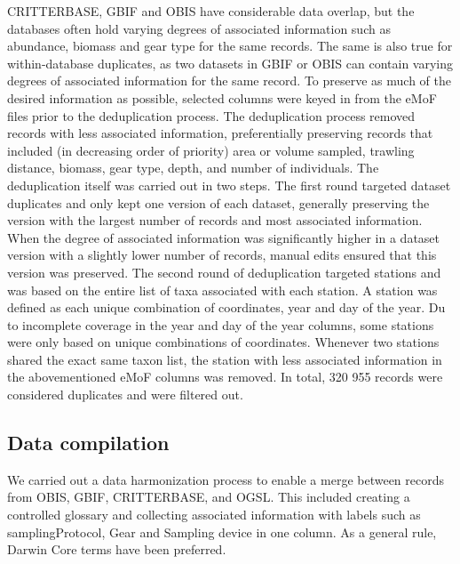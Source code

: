 \documentclass[
  letterpaper,
  DIV=11,
  numbers=noendperiod]{scrartcl}
\begin{document}
CRITTERBASE, GBIF and OBIS have considerable data overlap, but the
databases often hold varying degrees of associated information such as
abundance, biomass and gear type for the same records. The same is also
true for within-database duplicates, as two datasets in GBIF or OBIS can
contain varying degrees of associated information for the same record.
To preserve as much of the desired information as possible, selected
columns were keyed in from the eMoF files prior to the deduplication
process. The deduplication process removed records with less associated
information, preferentially preserving records that included (in
decreasing order of priority) area or volume sampled, trawling distance,
biomass, gear type, depth, and number of individuals. The deduplication
itself was carried out in two steps. The first round targeted dataset
duplicates and only kept one version of each dataset, generally
preserving the version with the largest number of records and most
associated information. When the degree of associated information was
significantly higher in a dataset version with a slightly lower number
of records, manual edits ensured that this version was preserved. The
second round of deduplication targeted stations and was based on the
entire list of taxa associated with each station. A station was defined
as each unique combination of coordinates, year and day of the year. Du
to incomplete coverage in the year and day of the year columns, some
stations were only based on unique combinations of coordinates. Whenever
two stations shared the exact same taxon list, the station with less
associated information in the abovementioned eMoF columns was removed.
In total, 320 955 records were considered duplicates and were filtered
out.

\subsection{Data compilation}\label{data-compilation}

We carried out a data harmonization process to enable a merge between
records from OBIS, GBIF, CRITTERBASE, and OGSL. This included creating a
controlled glossary and collecting associated information with labels
such as samplingProtocol, Gear and Sampling device in one column. As a
general rule, Darwin Core terms have been preferred.
\end{document}
